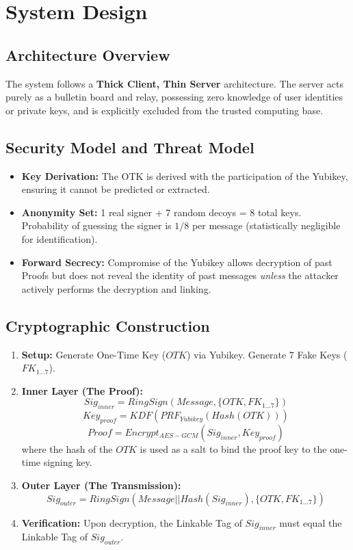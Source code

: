 \documentclass[letterpaper,11pt]{article}
\begin{document}
\section{System Design}

\subsection{Architecture Overview}
The system follows a \textbf{Thick Client, Thin Server} architecture. The server acts purely as a bulletin board and relay, possessing zero knowledge of user identities or private keys, and is explicitly excluded from the trusted computing base.

\subsection{Security Model and Threat Model}
\begin{itemize}
    \item \textbf{Key Derivation:} The OTK is derived with the participation of the Yubikey, ensuring it cannot be predicted or extracted.
    \item \textbf{Anonymity Set:} 1 real signer + 7 random decoys = 8 total keys. Probability of guessing the signer is $1/8$ per message (statistically negligible for identification).
    \item \textbf{Forward Secrecy:} Compromise of the Yubikey allows decryption of past Proofs but does not reveal the identity of past messages \textit{unless} the attacker actively performs the decryption and linking.
\end{itemize}

\subsection{Cryptographic Construction}
\begin{enumerate}
    \item \textbf{Setup:} Generate One-Time Key ($OTK$) via Yubikey. Generate 7 Fake Keys ($FK_{1...7}$).
    \item \textbf{Inner Layer (The Proof):}
          $$ Sig_{inner} = RingSign(Message, \{OTK, FK_{1...7}\}) $$
          $$ Key_{proof} = KDF(PRF_{Yubikey}(Hash(OTK))) $$
          $$ Proof = Encrypt_{AES-GCM}(Sig_{inner}, Key_{proof}) $$
          where the hash of the $OTK$ is used as a salt to bind the proof key to the one-time signing key.
    \item \textbf{Outer Layer (The Transmission):}
          $$ Sig_{outer} = RingSign(Message || Hash(Sig_{inner}), \{OTK, FK_{1...7}\}) $$
    \item \textbf{Verification:} Upon decryption, the Linkable Tag of $Sig_{inner}$ must equal the Linkable Tag of $Sig_{outer}$.
\end{enumerate}
\end{document}
